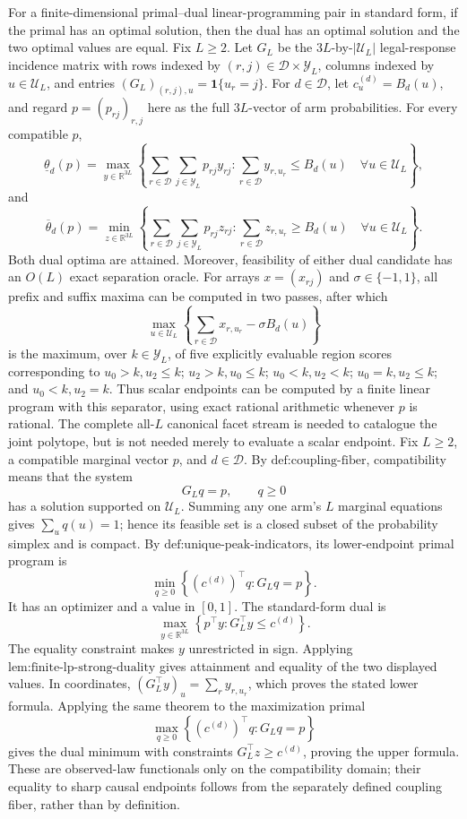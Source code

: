 For a finite-dimensional primal--dual linear-programming pair in standard form, if the primal has an optimal solution, then the dual has an optimal solution and the two optimal values are equal.
Fix \(L\ge2\).  Let \(G_L\) be the \(3L\)-by-\(|\mathcal U_L|\) legal-response incidence matrix with rows indexed by \((r,j)\in\mathcal D\times\mathcal Y_L\), columns indexed by \(u\in\mathcal U_L\), and entries \((G_L)_{(r,j),u}=\mathbf 1\{u_r=j\}\).  For \(d\in\mathcal D\), let \(c^{(d)}_u=B_d(u)\), and regard \(p=(p_{rj})_{r,j}\) here as the full \(3L\)-vector of arm probabilities.  For every compatible \(p\),
\[
 \underline\theta_d(p)=
 \max_{y\in\mathbb R^{3L}}
 \left\{\sum_{r\in\mathcal D}\sum_{j\in\mathcal Y_L}p_{rj}y_{rj}:
 \sum_{r\in\mathcal D}y_{r,u_r}\le B_d(u)\quad\forall u\in\mathcal U_L\right\},
\]
and
\[
 \overline\theta_d(p)=
 \min_{z\in\mathbb R^{3L}}
 \left\{\sum_{r\in\mathcal D}\sum_{j\in\mathcal Y_L}p_{rj}z_{rj}:
 \sum_{r\in\mathcal D}z_{r,u_r}\ge B_d(u)\quad\forall u\in\mathcal U_L\right\}.
\]
Both dual optima are attained.  Moreover, feasibility of either dual candidate has an \(O(L)\) exact separation oracle.  For arrays \(x=(x_{rj})\) and \(\sigma\in\{-1,1\}\), all prefix and suffix maxima can be computed in two passes, after which
\[
 \max_{u\in\mathcal U_L}\left\{\sum_{r\in\mathcal D}x_{r,u_r}-\sigma B_d(u)\right\}
\]
is the maximum, over \(k\in\mathcal Y_L\), of five explicitly evaluable region scores corresponding to \(u_0>k,u_2\le k\); \(u_2>k,u_0\le k\); \(u_0<k,u_2<k\); \(u_0=k,u_2\le k\); and \(u_0<k,u_2=k\).  Thus scalar endpoints can be computed by a finite linear program with this separator, using exact rational arithmetic whenever \(p\) is rational.  The complete all-\(L\) canonical facet stream is needed to catalogue the joint polytope, but is not needed merely to evaluate a scalar endpoint.
Fix \(L\ge2\), a compatible marginal vector \(p\), and \(d\in\mathcal D\).  By \(\text{def:coupling-fiber}\), compatibility means that the system
\[
 G_Lq=p,\qquad q\ge0
\]
has a solution supported on \(\mathcal U_L\).  Summing any one arm's \(L\) marginal equations gives \(\sum_u q(u)=1\); hence its feasible set is a closed subset of the probability simplex and is compact.  By \(\text{def:unique-peak-indicators}\), its lower-endpoint primal program is
\[
 \min_{q\ge0}\left\{(c^{(d)})^\top q:G_Lq=p\right\}.
\]
It has an optimizer and a value in \([0,1]\).  The standard-form dual is
\[
 \max_{y\in\mathbb R^{3L}}\left\{p^\top y:G_L^\top y\le c^{(d)}\right\}.
\]
The equality constraint makes \(y\) unrestricted in sign.  Applying \(\text{lem:finite-lp-strong-duality}\) gives attainment and equality of the two displayed values.  In coordinates, \((G_L^\top y)_u=\sum_r y_{r,u_r}\), which proves the stated lower formula.  Applying the same theorem to the maximization primal
\[
 \max_{q\ge0}\left\{(c^{(d)})^\top q:G_Lq=p\right\}
\]
gives the dual minimum with constraints \(G_L^\top z\ge c^{(d)}\), proving the upper formula.  These are observed-law functionals only on the compatibility domain; their equality to sharp causal endpoints follows from the separately defined coupling fiber, rather than by definition.

